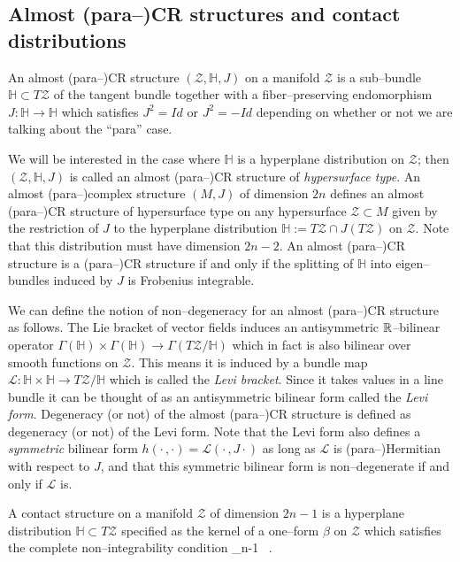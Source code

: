 \subsection{Almost (para--)CR structures and contact distributions}

\begin{defi}
An almost (para--)CR structure $(\mathcal{Z},\mathbb{H} ,J)$ on a manifold $\mathcal{Z}$ is a sub--bundle $\mathbb{H} \subset T\mathcal{Z}$ of the tangent bundle together with a fiber--preserving endomorphism $J:\mathbb{H} \rightarrow \mathbb{H} $ which satisfies $J^2=Id$ or $J^2=-Id$ depending on whether or not we are talking about the ``para'' case.
\end{defi}

We will be interested in the case where $ \mathbb{H} $ is a hyperplane distribution on $\mathcal{Z}$; then $(\mathcal{Z}, \mathbb{H} ,J)$ is called an almost (para--)CR structure of \textit{hypersurface type}. An almost (para--)complex structure $(M,J)$ of dimension $2n$ defines an almost (para--)CR structure of hypersurface type on any hypersurface $\mathcal{Z}\subset M$ given by the restriction of $J$ to the hyperplane distribution $ \mathbb{H} :=T\mathcal{Z}\cap J(T\mathcal{Z})$ on $\mathcal{Z}$. Note that this distribution must have dimension $2n-2$. An almost (para--)CR structure is a (para--)CR structure if and only if the splitting of $ \mathbb{H} $ into eigen--bundles induced by $J$ is Frobenius integrable.

We can define the notion of non--degeneracy for an almost (para--)CR structure as follows. The Lie bracket of vector fields induces an antisymmetric $\mathbb{R}$--bilinear operator $\Gamma( \mathbb{H} )\times\Gamma( \mathbb{H} )\rightarrow\Gamma(T\mathcal{Z}/ \mathbb{H} )$ which in fact is also bilinear over smooth functions on $\mathcal{Z}$. This means it is induced by a bundle map $\mathcal{L}: \mathbb{H} \times \mathbb{H} \rightarrow T\mathcal{Z}/ \mathbb{H} $ which is called the \textit{Levi bracket}. Since it takes values in a line bundle it can be thought of as an antisymmetric bilinear form called the \textit{Levi form}. Degeneracy (or not) of the almost (para--)CR structure is defined as degeneracy (or not) of the Levi form. Note that the Levi form also defines a \textit{symmetric} bilinear form $h(\cdot\,,\cdot)=\mathcal{L}(\cdot\,,J\cdot)$ as long as $\mathcal{L}$ is (para--)Hermitian with respect to $J$, and that this symmetric bilinear form is non--degenerate if and only if $\mathcal{L}$ is.

\begin{defi}
A contact structure on a manifold $\mathcal{Z}$ of dimension $2n-1$ is a hyperplane distribution $ \mathbb{H} \subset T\mathcal{Z}$ specified as the kernel of a one--form $\beta$ on $\mathcal{Z}$ which satisfies the complete non--integrability condition
\be \label{eq:non_integrability}
\beta\wedge {}_{n-1\ } .
\ee
\end{defi}

